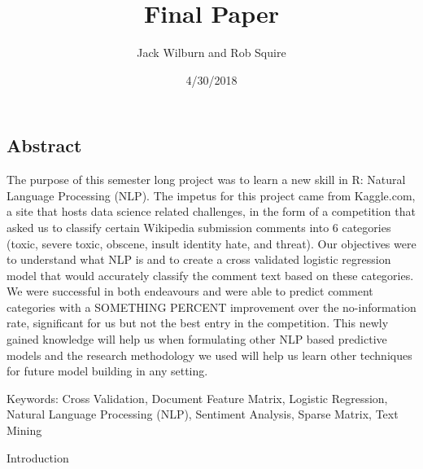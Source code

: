 \documentclass[]{article}
\title{Final Paper}
\author{Jack Wilburn and Rob Squire}
\date{4/30/2018}
\begin{document}
\maketitle

\subsection{Abstract}\label{abstract}

The purpose of this semester long project was to learn a new skill in R:
Natural Language Processing (NLP). The impetus for this project came
from Kaggle.com, a site that hosts data science related challenges, in
the form of a competition that asked us to classify certain Wikipedia
submission comments into 6 categories (toxic, severe toxic, obscene,
insult identity hate, and threat). Our objectives were to understand
what NLP is and to create a cross validated logistic regression model
that would accurately classify the comment text based on these
categories. We were successful in both endeavours and were able to
predict comment categories with a SOMETHING PERCENT improvement over the
no-information rate, significant for us but not the best entry in the
competition. This newly gained knowledge will help us when formulating
other NLP based predictive models and the research methodology we used
will help us learn other techniques for future model building in any
setting.

Keywords: Cross Validation, Document Feature Matrix, Logistic
Regression, Natural Language Processing (NLP), Sentiment Analysis,
Sparse Matrix, Text Mining

Introduction
\end{document}
